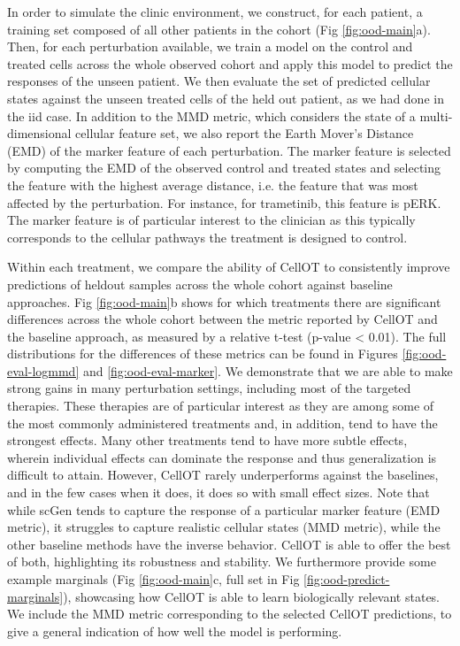 In order to simulate the clinic environment, we construct, for each patient, a training set composed of all other patients in the cohort (Fig \ref{fig:ood-main}a).
Then, for each perturbation available,
we train a model on the control and treated cells across the whole observed cohort
and apply this model to predict the responses of the unseen patient.
We then evaluate the set of predicted cellular states against the unseen treated cells of the held out patient, as we had done in the iid case.
In addition to the MMD metric, which considers the state of a multi-dimensional cellular feature set,
we also report the Earth Mover’s Distance (EMD) of the marker feature of each perturbation.
The marker feature is selected by computing the EMD of the observed control and treated states and selecting the feature with the highest average distance,
i.e. the feature that was most affected by the perturbation.
For instance, for trametinib, this feature is pERK.
The marker feature is of particular interest to the clinician as this typically corresponds to the cellular pathways the treatment is designed to control.

Within each treatment, we compare the ability of CellOT to consistently improve predictions of heldout samples across the whole cohort against baseline approaches.
Fig \ref{fig:ood-main}b shows for which treatments there are significant differences across the whole cohort between
the metric reported by CellOT and the baseline approach, as measured by a relative t-test (p-value < 0.01).
The full distributions for the differences of these metrics can be found in Figures \ref{fig:ood-eval-logmmd} and \ref{fig:ood-eval-marker}.
We demonstrate that we are able to make strong gains in many perturbation settings, including most of the targeted therapies.
These therapies are of particular interest as they are among some of the most commonly administered treatments \cite{need} and, in addition, tend to have the strongest effects.
Many other treatments tend to have more subtle effects, wherein individual effects can dominate the response and thus generalization is difficult to attain.
However, CellOT rarely underperforms against the baselines, and in the few cases when it does, it does so with small effect sizes.
Note that while scGen tends to capture the response of a particular marker feature (EMD metric), it struggles to capture realistic cellular states (MMD metric), while the other baseline methods have the inverse behavior.
CellOT is able to offer the best of both, highlighting its robustness and stability.
We furthermore provide some example marginals (Fig \ref{fig:ood-main}c, full set in Fig \ref{fig:ood-predict-marginals}), showcasing how CellOT is able to learn biologically relevant states.
We include the MMD metric corresponding to the selected CellOT predictions, to give a general indication of how well the model is performing.

